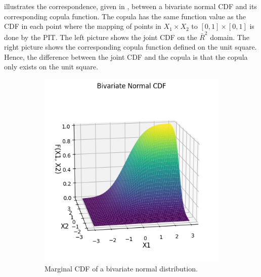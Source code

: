  illustrates the correspondence, given in , between a bivariate normal \gls{CDF} and its corresponding copula function. The copula has the same function value as the \gls{CDF} in each point where the mapping of points in $X_1\times X_2$ to $[0,1]\times[0,1]$ is done by the \gls{PIT}. The left picture shows the joint \gls{CDF} on the $\bar{R}^2$ domain. The right picture shows the corresponding copula function defined on the unit square. Hence, the difference between the joint \gls{CDF} and the copula is that the copula only exists on the unit square. 

\begin{figure}
    \centering
    \begin{subfigure}[t]{0.45\linewidth}
        \centering
        \includegraphics[width=\linewidth]{3Theory/pictures/BivariateCDF.png}
        \caption{Marginal \gls{CDF} of a bivariate normal distribution.}
    \end{subfigure}
    \hfill
    \begin{subfigure}[t]{0.45\linewidth}
        \centering

\end{subfigure}
\end{figure}
